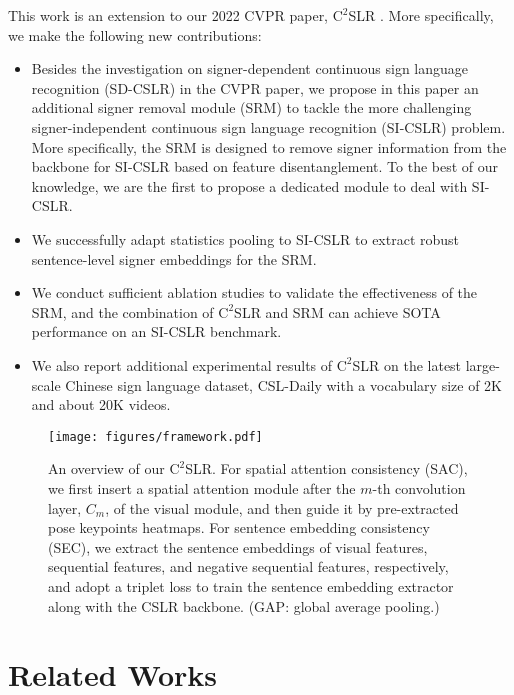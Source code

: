 \documentclass[acmsmall,screen]{acmart}
\begin{document}
This work is an extension to our 2022 CVPR paper, $\text{C}^2$SLR \cite{zuo2022c2slr}. More specifically, we make the following new contributions:
\begin{itemize}
    \item Besides the investigation on signer-dependent continuous sign language recognition (SD-CSLR) in the CVPR paper, we propose in this paper an additional signer removal module (SRM) to tackle the more challenging signer-independent continuous sign language recognition (SI-CSLR) problem. More specifically, the SRM is designed to remove signer information from the backbone for SI-CSLR based on feature disentanglement. To the best of our knowledge, we are the first to propose a dedicated module to deal with SI-CSLR.
    \item We successfully adapt statistics pooling to SI-CSLR to extract robust sentence-level signer embeddings for the SRM.
    \item We conduct sufficient ablation studies to validate the effectiveness of the SRM, and the combination of $\text{C}^2$SLR and SRM can achieve SOTA performance on an SI-CSLR benchmark.
    \item We also report additional experimental results of $\text{C}^2$SLR on the latest large-scale Chinese sign language dataset, CSL-Daily \cite{zhou2021improving} with a vocabulary size of 2K and about 20K videos.
\end{itemize}



%
 \begin{figure*}[t]
  \centering
  \texttt{[image: figures/framework.pdf]}
  \caption{An overview of our $\text{C}^2$SLR. For spatial attention consistency (SAC), we first insert a spatial attention module after the $m$-th convolution layer, $C_m$, of the visual module, and then guide it by pre-extracted pose keypoints heatmaps. For sentence embedding consistency (SEC), we extract the sentence embeddings of visual features, sequential features, and negative sequential features, respectively, and adopt a triplet loss to train the sentence embedding extractor along with the CSLR backbone. (GAP: global average pooling.)}
  \label{fig:framework}
\end{figure*}


\section{Related Works}
\end{document}
